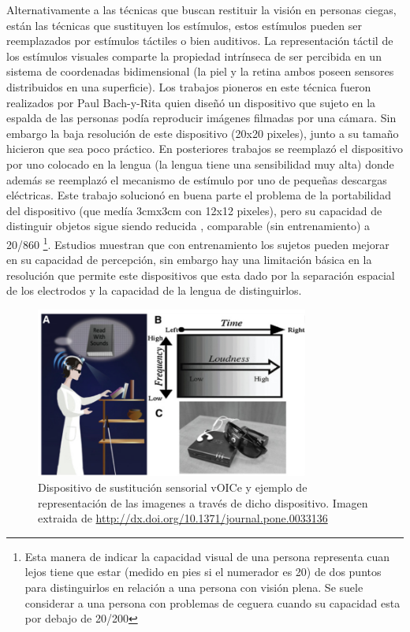 \documentclass{article}
\numberwithin{figure}{section}
\begin{document}
    Alternativamente a las técnicas que buscan restituir la visión en personas ciegas, están las técnicas que sustituyen los estímulos, estos estímulos pueden ser reemplazados por estímulos táctiles o bien auditivos. La representación táctil de los estímulos visuales comparte la propiedad intrínseca de ser percibida en un sistema de coordenadas bidimensional (la piel y la retina ambos poseen sensores distribuidos en una superficie). Los trabajos pioneros en este técnica fueron realizados por Paul Bach-y-Rita \cite{Tactil1} quien diseñó un dispositivo que sujeto en la espalda de las personas podía reproducir imágenes filmadas por una cámara. Sin embargo la baja resolución de este dispositivo (20x20 pixeles), junto a su tamaño hicieron que sea poco práctico. En posteriores trabajos \cite{Tactil2} se reemplazó el dispositivo por uno colocado en la lengua (la lengua tiene una sensibilidad muy alta) donde además se reemplazó el mecanismo de estímulo por uno de pequeñas descargas eléctricas. Este trabajo solucionó en buena parte el problema de la portabilidad del dispositivo (que medía 3cmx3cm con 12x12 pixeles), pero su capacidad de distinguir objetos sigue siendo reducida \cite{Tactil3}, comparable (sin entrenamiento) a 20/860 \footnote{Esta manera de indicar la capacidad visual de una persona representa cuan lejos tiene que estar (medido en pies si el numerador es 20) de dos puntos para distinguirlos en relación a una persona con visión plena. Se suele considerar a una persona con problemas de ceguera cuando su capacidad esta por debajo de 20/200}. Estudios \cite{Tactil4} muestran que con entrenamiento los sujetos pueden mejorar en su capacidad de percepción, sin embargo hay una limitación básica en la resolución que permite este dispositivos que esta dado por la separación espacial de los electrodos y la capacidad de la lengua de distinguirlos. 
    
    \begin{figure}
        \center
        \includegraphics[width=0.8\textwidth]{Imagenes/Voice2.png}
        \caption{Dispositivo de sustitución sensorial vOICe y ejemplo de representación de las imagenes a través de dicho dispositivo. Imagen extraida de \url{http://dx.doi.org/10.1371/journal.pone.0033136}}
        \label{fig:Voice2}
    \end{figure}
    
\end{document}
